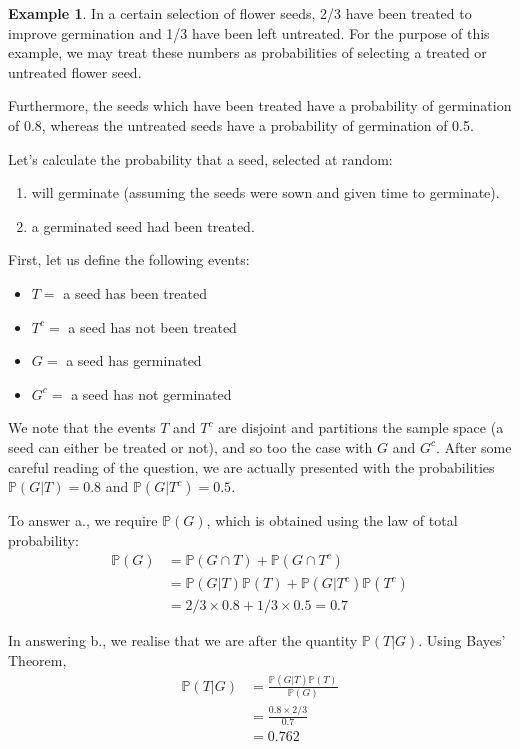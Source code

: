 \documentclass[
]{book}
\providecommand{\tightlist}{%
  \setlength{\itemsep}{0pt}\setlength{\parskip}{0pt}}
\newcommand{\bbP}{\mathbb{P}}
\theoremstyle{definition}
\theoremstyle{definition}
\newtheorem{example}{Example}[chapter]
\theoremstyle{definition}
\theoremstyle{definition}
\theoremstyle{remark}
\begin{document}
\begin{example}
In a certain selection of flower seeds, 2/3 have been treated to improve germination and 1/3 have been left untreated.
For the purpose of this example, we may treat these numbers as probabilities of selecting a treated or untreated flower seed.

Furthermore, the seeds which have been treated have a probability of germination of 0.8, whereas the untreated seeds have a probability of germination of 0.5.

Let's calculate the probability that a seed, selected at random:

\begin{enumerate}
\def\labelenumi{(\alph{enumi})}
\tightlist
\item
  will germinate (assuming the seeds were sown and given time to germinate).
\item
  a germinated seed had been treated.
\end{enumerate}

First, let us define the following events:

\begin{itemize}
\tightlist
\item
  \(T=\) a seed has been treated
\item
  \(T^c=\) a seed has not been treated
\item
  \(G=\) a seed has germinated
\item
  \(G^c=\) a seed has not germinated
\end{itemize}

We note that the events \(T\) and \(T^c\) are disjoint and partitions the sample space (a seed can either be treated or not), and so too the case with \(G\) and \(G^c\).
After some careful reading of the question, we are actually presented with the probabilities \(\bbP(G|T)=0.8\) and \(\bbP(G|T^c)=0.5\).

To answer a., we require \(\bbP(G)\), which is obtained using the law of total probability:
\begin{align*}
\bbP(G) 
&= \bbP(G \cap T) + \bbP(G\cap T^c) \\
&= \bbP(G |T)\bbP(T) + \bbP(G|T^c)\bbP(T^c) \\
&= 2/3 \times 0.8 + 1/3 \times 0.5 = 0.7
\end{align*}

In answering b., we realise that we are after the quantity \(\bbP(T|G)\). Using Bayes' Theorem,
\begin{align*}
\bbP(T|G)
&= \frac{\bbP(G|T)\bbP(T)}{\bbP(G)} \\
&= \frac{0.8 \times 2/3}{0.7} \\
&= 0.762
\end{align*}
\end{example}
\end{document}
